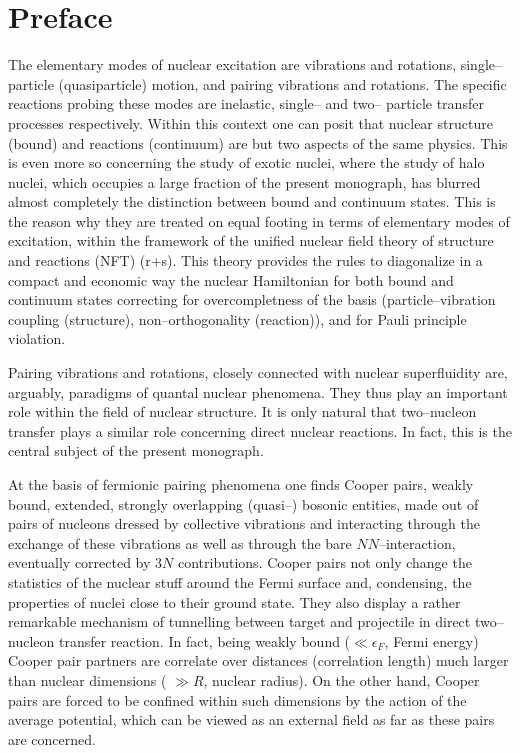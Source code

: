 
 \chapter*{Preface}
The elementary modes of nuclear excitation are vibrations and rotations, single--particle (quasiparticle)  motion, and pairing vibrations and rotations. The specific reactions probing these modes are inelastic,  single-- and two-- particle transfer processes respectively. Within this context one can posit that nuclear structure (bound) and reactions (continuum) are but two aspects of the same physics. This is even more so concerning the study of exotic nuclei, where the study of halo nuclei, which occupies a large fraction of the present monograph, has blurred almost completely the distinction between bound and continuum states. This is the reason why they are treated on equal footing in terms of elementary modes of excitation, within the framework of the unified nuclear field theory of structure and reactions (NFT) (r+s). This theory provides the rules to diagonalize in a compact and economic way the nuclear Hamiltonian for both bound and continuum states correcting for overcompletness of the basis (particle--vibration coupling (structure), non--orthogonality (reaction)), and for Pauli principle violation. 

Pairing vibrations and rotations, closely connected with nuclear superfluidity are, arguably,  paradigms of quantal nuclear phenomena. They thus play an important  role within the field of nuclear structure. It is only natural that two--nucleon transfer plays a similar role concerning direct nuclear reactions. In fact, this is the central subject of the present monograph.


At the basis of fermionic pairing phenomena one finds Cooper pairs, weakly bound, extended, strongly overlapping (quasi--) bosonic entities, made out of pairs of nucleons dressed by collective vibrations and interacting through the exchange of these vibrations as well as through the bare $NN$--interaction, eventually corrected by $3N$ contributions.
Cooper pairs not only change the statistics of the nuclear stuff around the Fermi surface and, condensing, the properties of nuclei close to their ground state. They also display a rather remarkable mechanism of tunnelling between  target and projectile in  direct two--nucleon transfer reaction. In fact, being weakly bound ($\ll \epsilon_F$, Fermi energy) Cooper pair partners are correlate over distances (correlation length) much larger than nuclear dimensions ( $\gg R$, nuclear radius). On the other hand, Cooper pairs are forced to be confined within such dimensions by the action of the average potential, which can be viewed as an external field as far as these pairs are concerned.


